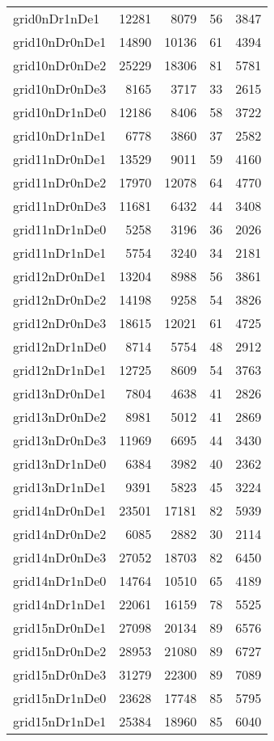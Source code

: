 \begin{longtable}{lrrrr}
grid0nDr1nDe1 & 12281 & 8079 & 56 & 3847 \\
grid10nDr0nDe1 & 14890 & 10136 & 61 & 4394 \\
grid10nDr0nDe2 & 25229 & 18306 & 81 & 5781 \\
grid10nDr0nDe3 & 8165 & 3717 & 33 & 2615 \\
grid10nDr1nDe0 & 12186 & 8406 & 58 & 3722 \\
grid10nDr1nDe1 & 6778 & 3860 & 37 & 2582 \\
grid11nDr0nDe1 & 13529 & 9011 & 59 & 4160 \\
grid11nDr0nDe2 & 17970 & 12078 & 64 & 4770 \\
grid11nDr0nDe3 & 11681 & 6432 & 44 & 3408 \\
grid11nDr1nDe0 & 5258 & 3196 & 36 & 2026 \\
grid11nDr1nDe1 & 5754 & 3240 & 34 & 2181 \\
grid12nDr0nDe1 & 13204 & 8988 & 56 & 3861 \\
grid12nDr0nDe2 & 14198 & 9258 & 54 & 3826 \\
grid12nDr0nDe3 & 18615 & 12021 & 61 & 4725 \\
grid12nDr1nDe0 & 8714 & 5754 & 48 & 2912 \\
grid12nDr1nDe1 & 12725 & 8609 & 54 & 3763 \\
grid13nDr0nDe1 & 7804 & 4638 & 41 & 2826 \\
grid13nDr0nDe2 & 8981 & 5012 & 41 & 2869 \\
grid13nDr0nDe3 & 11969 & 6695 & 44 & 3430 \\
grid13nDr1nDe0 & 6384 & 3982 & 40 & 2362 \\
grid13nDr1nDe1 & 9391 & 5823 & 45 & 3224 \\
grid14nDr0nDe1 & 23501 & 17181 & 82 & 5939 \\
grid14nDr0nDe2 & 6085 & 2882 & 30 & 2114 \\
grid14nDr0nDe3 & 27052 & 18703 & 82 & 6450 \\
grid14nDr1nDe0 & 14764 & 10510 & 65 & 4189 \\
grid14nDr1nDe1 & 22061 & 16159 & 78 & 5525 \\
grid15nDr0nDe1 & 27098 & 20134 & 89 & 6576 \\
grid15nDr0nDe2 & 28953 & 21080 & 89 & 6727 \\
grid15nDr0nDe3 & 31279 & 22300 & 89 & 7089 \\
grid15nDr1nDe0 & 23628 & 17748 & 85 & 5795 \\
grid15nDr1nDe1 & 25384 & 18960 & 85 & 6040 \\

\end{longtable}
